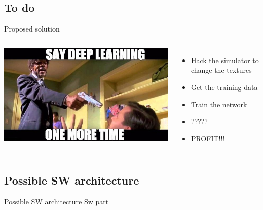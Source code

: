 \documentclass{beamer}
\begin{document}
    \subsection{To do}
    \begin{frame}{Proposed solution}

    \pause

    \begin{columns}

        \includegraphics[width=\textwidth]{fig/meme.jpeg}\pause


    \begin{itemize}
        \item Hack the simulator to change the textures\pause
        \item Get the training data\pause
        \item Train the network\pause
        \item ?????\pause
        \item PROFIT!!!\pause
    \end{itemize}
    \end{columns}
    \end{frame}

    \subsection{Possible SW architecture}
    \begin{frame}{Possible SW architecture}
    Sw part
    \end{frame}
\end{document}
